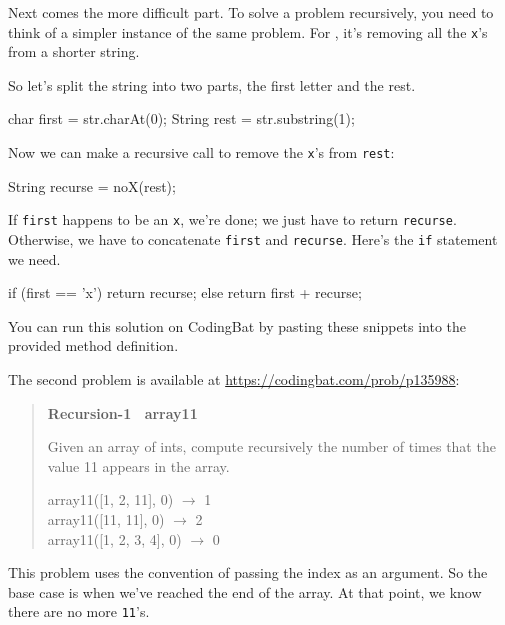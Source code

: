 
Next comes the more difficult part.
To solve a problem recursively, you need to think of a simpler instance of the same problem.
For , it's removing all the {\tt x}'s from a shorter string.

So let's split the string into two parts, the first letter and the rest.

\begin{code}
    char first = str.charAt(0);
    String rest = str.substring(1);
\end{code}

Now we can make a recursive call to remove the {\tt x}'s from {\tt rest}:

\begin{code}
    String recurse = noX(rest);
\end{code}

If {\tt first} happens to be an {\tt x}, we're done; we just have to return {\tt recurse}.  Otherwise, we have to concatenate {\tt first} and {\tt recurse}.  Here's the {\tt if} statement we need.

\begin{code}
    if (first == 'x') {
        return recurse;
    } else {
        return first + recurse;
    }
\end{code}

You can run this solution on CodingBat by pasting these snippets into the provided method definition.

The second problem is available at \url{https://codingbat.com/prob/p135988}:

\begin{quote}
\textbf{Recursion-1 ~array11}

Given an array of ints, compute recursively the number of times that the value 11 appears in the array.

\ttfamily
array11([1, 2, 11], 0) $\rightarrow$ 1 \\
array11([11, 11], 0) $\rightarrow$ 2 \\
array11([1, 2, 3, 4], 0) $\rightarrow$ 0
\end{quote}

This problem uses the convention of passing the index as an argument.
So the base case is when we've reached the end of the array.
At that point, we know there are no more {\tt 11}'s.

